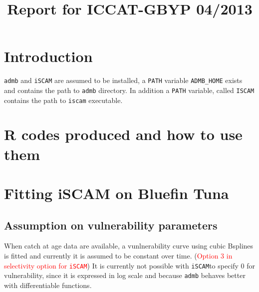 \documentclass[a4paper]{article}\usepackage{graphicx, color}
\title{Report for ICCAT-GBYP 04/2013}
\makeatletter
\newenvironment{kframe}{%
 \def\at@end@of@kframe{}%
 \ifinner\ifhmode%
  \def\at@end@of@kframe{\end{minipage}}%
  \begin{minipage}{\columnwidth}%
 \fi\fi%
 \def\FrameCommand##1{\hskip\@totalleftmargin \hskip-\fboxsep
 \colorbox{shadecolor}{##1}\hskip-\fboxsep
     \hskip-\linewidth \hskip-\@totalleftmargin \hskip\columnwidth}%
 \MakeFramed {\advance\hsize-\width
   \@totalleftmargin\z@ \linewidth\hsize
   \@setminipage}}%
 {\par\unskip\endMakeFramed%
 \at@end@of@kframe}
\newenvironment{knitrout}{}{} %
\newcommand{\iscam}{\texttt{iSCAM}}
\newcommand{\admb}{\texttt{admb} }
\newcommand{\com}[1]{\textcolor{red}{#1}}
\makeatother
\begin{document}
\maketitle
\section{Introduction}

\verb+admb+ and \verb+iSCAM+ are assumed to be installed, a \verb+PATH+ variable \verb+ADMB_HOME+ exists and contains the path to \verb+admb+ directory. In addition a \verb+PATH+ variable, called \verb+ISCAM+ contains the path to \verb+iscam+ executable.   
\section{R codes produced and how to use them}

\section{Fitting iSCAM on Bluefin Tuna }
\subsection{Assumption on vulnerability parameters}
When catch at age data are available, a vunlnerability curve using cubic Bsplines is fitted and currently it is assumed to be constant over time. (\com{Option 3 in selectivity option for \iscam})
It is currently not possible with \iscam to specify 0 for vulnerability, since it is expressed in log scale and because \admb behaves better with differentiable functions.

\begin{knitrout}
\color{fgcolor}\begin{kframe}


{\ttfamily\noindent\color{warningcolor}{\#\# Warning: NAs introduced by coercion}}\end{kframe}
\end{knitrout}
\end{document}
